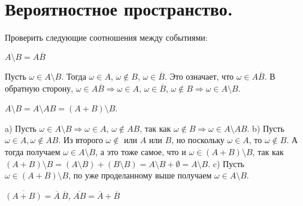 
\section{Вероятностное пространство.}

\begin{task}{1} 
  Проверить следующие соотношения между событиями: 
\end{task}


\begin{subtask}{1}
  $A \setminus B = A \overline{B}$
\end{subtask}

\begin{solution}
Пусть $\omega \in A \setminus B$. Тогда $\omega \in A$, $\omega \not\in B$, $
\omega \in \overline{B}$. Это означает, что $\omega \in A\overline{B}$. 
В обратную сторону, $\omega \in A\overline{B} \Rightarrow \omega \in A$, $\omega \in 
\overline{B}$, $\omega \not\in B \Rightarrow \omega \in A \setminus B$.
\end{solution}


\begin{subtask}{2}
$A \setminus B = A \setminus AB = \left( A + B \right)  \setminus B$.
\end{subtask}

\begin{solution}
a) Пусть $\omega \in A \setminus B \Rightarrow \omega \in A$, $\omega \not\in AB$, так 
как $\omega \not\in B \Rightarrow \omega \in A \setminus AB$. 
b) Пусть $\omega \in A, \omega \not\in
AB$. Из второго $\omega \not\in$ или $A$ или $B$, но поскольку $\omega \in A$, то $\omega \not\in
B$. А тогда получаем $\omega \in A \setminus B$, а это тоже самое, что и $\omega \in (A + B) \setminus
B$, так как $(A + B) \setminus B = (A \setminus B) + (B \setminus B) = A \setminus B + \emptyset = 
A \setminus B$. 
c) Пусть $\omega \in (A + B) \setminus B$, по уже проделанному выше получаем $\omega
\in A \setminus B$.
\end{solution}


\begin{subtask}{3}
$\overline{\left( A + B \right) } = \overline{A}~\overline{B}$, $\overline{AB} = \overline{A} + 
\overline{B}$
\end{subtask}

